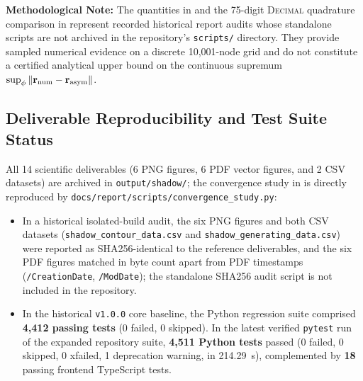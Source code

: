 \noindent \textbf{Methodological Note:} The quantities in  and the 75-digit \textsc{Decimal} quadrature comparison in  represent recorded historical report audits whose standalone scripts are not archived in the repository's \texttt{scripts/} directory. They provide sampled numerical evidence on a discrete 10,001-node grid and do not constitute a certified analytical upper bound on the continuous supremum $\sup_\phi \|\mathbf{r}_{\rm num} - \mathbf{r}_{\rm asym}\|$.

\subsection{Deliverable Reproducibility and Test Suite Status}
All 14 scientific deliverables (6 PNG figures, 6 PDF vector figures, and 2 CSV datasets) are archived in \texttt{output/shadow/}; the convergence study in  is directly reproduced by \texttt{docs/report/scripts/convergence\_study.py}:
\begin{itemize}
    \item In a historical isolated-build audit, the six PNG figures and both CSV datasets (\texttt{shadow\_\allowbreak contour\_\allowbreak data.csv} and \texttt{shadow\_\allowbreak generating\_\allowbreak data.csv}) were reported as SHA256-identical to the reference deliverables, and the six PDF figures matched in byte count apart from PDF timestamps (\texttt{/Creation\allowbreak Date}, \texttt{/Mod\allowbreak Date}); the standalone SHA256 audit script is not included in the repository.
    \item In the historical \texttt{v1.0.0} core baseline, the Python regression suite comprised \textbf{4,412 passing tests} (0 failed, 0 skipped). In the latest verified \texttt{pytest} run of the expanded repository suite, \textbf{4,511 Python tests} passed (0 failed, 0 skipped, 0 xfailed, 1 deprecation warning, in 214.29~s), complemented by \textbf{18} passing frontend TypeScript tests.
\end{itemize}
